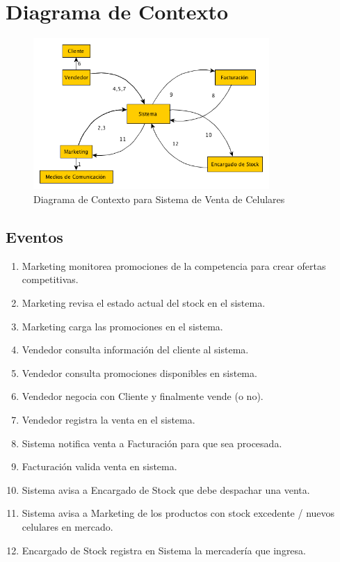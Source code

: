 \section{Diagrama de Contexto}

\begin{figure}[h!]
  	\centering
	\includegraphics[width=0.8\textwidth]{./imagenes/diagrama_contexto.png}
	\caption{Diagrama de Contexto para Sistema de Venta de Celulares}
\end{figure}

\subsection{Eventos}

\begin{enumerate}

	\item Marketing monitorea promociones de la competencia para crear ofertas competitivas.
	 
	\item Marketing revisa el estado actual del stock en el sistema.
	 
	\item Marketing carga las promociones en el sistema.
	 
	\item Vendedor consulta información del cliente al sistema.
	 
	\item Vendedor consulta promociones disponibles en sistema.
	 
	\item Vendedor negocia con Cliente y finalmente vende (o no).
	 
	\item Vendedor registra la venta en el sistema.
	 
	\item Sistema notifica venta a Facturación para que sea procesada.
	 
	\item Facturación valida venta en sistema.
	 
	\item Sistema avisa a Encargado de Stock que debe despachar una venta.

	\item Sistema avisa a Marketing de los productos con stock excedente / nuevos celulares en mercado.

	\item Encargado de Stock registra en Sistema la mercadería que ingresa.

\end{enumerate}
